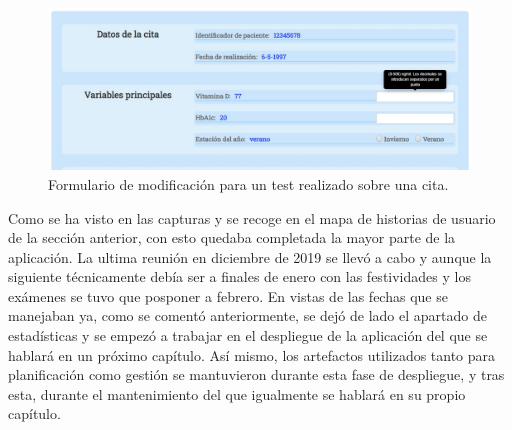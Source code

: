 \begin{figure}[h]
    \centering
     \includegraphics[width=1\textwidth]{images/modificarCita.jpg}
    \caption{Formulario de modificación para un test realizado sobre una cita.}
\end{figure}

Como se ha visto en las capturas y se recoge en el mapa de historias de usuario de la sección anterior, con esto quedaba completada la mayor parte de la aplicación. La ultima reunión en diciembre de 2019 se llevó a cabo y aunque la siguiente técnicamente debía ser a finales de enero con las festividades y los exámenes se tuvo que posponer a febrero. En vistas de las fechas que se manejaban ya, como se comentó anteriormente, se dejó de lado el apartado de estadísticas y se empezó a trabajar en el despliegue de la aplicación del que se hablará en un próximo capítulo. Así mismo, los artefactos utilizados tanto para planificación como gestión se mantuvieron durante esta fase de despliegue, y tras esta, durante el mantenimiento del que igualmente se hablará en su propio capítulo.